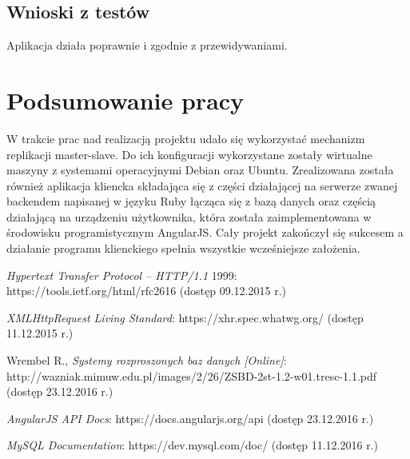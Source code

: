 \documentclass{mgr}
\begin{document}
\section{Wnioski z testów}
Aplikacja działa poprawnie i zgodnie z przewidywaniami.
\chapter{Podsumowanie pracy}
W trakcie prac nad realizacją projektu udało się wykorzystać mechanizm replikacji master-slave. Do ich konfiguracji wykorzystane zostały wirtualne maszyny z systemami operacyjnymi Debian oraz Ubuntu. Zrealizowana została również aplikacja kliencka składająca się z części działającej na serwerze zwanej backendem napisanej w języku Ruby łącząca się z bazą danych oraz częścią działającą na urządzeniu użytkownika, która została zaimplementowana w środowisku programistycznym AngularJS. Cały projekt zakończył się sukcesem a działanie programu klienckiego spełnia wszystkie
wcześniejsze założenia.
  \begin{thebibliography}{9}

   {\em Hypertext Transfer Protocol -- HTTP/1.1} 1999: 
  https://tools.ietf.org/html/rfc2616 (dostęp 09.12.2015 r.)

   {\em XMLHttpRequest Living Standard}: 
  https://xhr.spec.whatwg.org/ (dostęp 11.12.2015 r.)

   Wrembel R., {\em Systemy rozproszonych baz danych [Online]}:
  http://wazniak.mimuw.edu.pl/images/2/26/ZSBD-2st-1.2-w01.tresc-1.1.pdf
  (dostęp 23.12.2016 r.)

   {\em AngularJS API Docs}: https://docs.angularjs.org/api 
  (dostęp 23.12.2016 r.)

   {\em MySQL Documentation}: https://dev.mysql.com/doc/
  (dostęp 11.12.2016 r.)


  \end{thebibliography}

\listoffigures
{}
\end{document}
